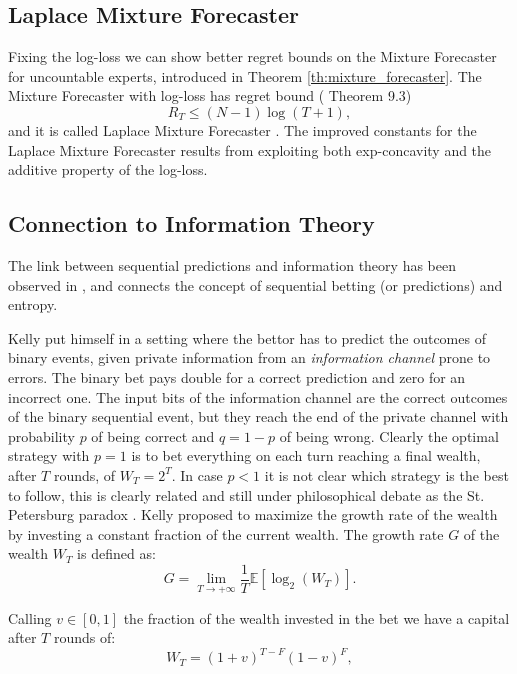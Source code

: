 \subsection{Laplace Mixture Forecaster}\label{sec:laplace_mixture}

Fixing the log-loss we can show better regret bounds on the Mixture Forecaster for uncountable experts, introduced in Theorem \ref{th:mixture_forecaster}. The Mixture Forecaster with log-loss has regret bound (\cite{cesa2006prediction} Theorem 9.3)
\begin{equation}
R_T\le(N-1)\log(T+1),
\end{equation}
and it is called Laplace Mixture Forecaster \cite{weinberger1994optimal}. The improved constants for the Laplace Mixture Forecaster results from exploiting both exp-concavity and the additive property of the log-loss.

\subsection{Connection to Information Theory}\label{sec:Info} 

The link between sequential predictions and information theory has been observed in \cite{kelly2011new}, and connects the concept of sequential betting (or predictions) and entropy.

Kelly put himself in a setting where the bettor has to predict the outcomes of binary events, given private information from an \emph{information channel} prone to errors. The binary bet pays double for a correct prediction and zero for an incorrect one. The input bits of the information channel are the correct outcomes of the binary sequential event, but they reach the end of the private channel with probability $p$ of being correct and $q=1-p$ of being wrong. Clearly the optimal strategy with $p=1$ is to bet everything on each turn reaching a final wealth, after $T$ rounds, of $W_T=2^T$. In case $p<1$ it is not clear which strategy is the best to follow, this is clearly related and still under philosophical debate as the St. Petersburg paradox \cite{samuelson1977st}. Kelly proposed to maximize the growth rate of the wealth by investing a constant fraction of the current wealth. The growth rate $G$ of the wealth $W_T$ is defined as:
$$G=\lim\limits_{T\to+\infty}\frac{1}{T}\mathbb E[\log_2(W_T)].$$

Calling $v\in[0,1]$ the fraction of the wealth invested in the bet we have a capital after $T$ rounds of:
$$W_T=(1+v)^{T-F}(1-v)^{F},$$ 


